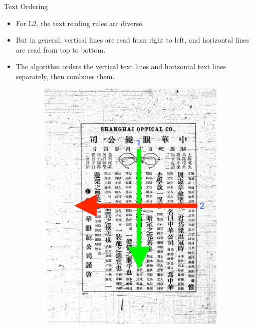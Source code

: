 \documentclass{beamer}
\begin{document}
\begin{frame}
    \begin{center}
        \Large{Text Ordering}
    \end{center}
    \begin{itemize}
        \item For L2, the text reading rules are diverse.
        \item But in general, vertical lines are read from right to left, and horizontal lines are read from top to bottom.
        \item The algorithm orders the vertical text lines and horizontal text lines separately, then combines them.
    \end{itemize}
    \begin{figure}
        \begin{subfigure}[b]{0.3\linewidth}
            \includegraphics[height=1.3\linewidth]{./figures/fnzz1_order.jpeg}
        \end{subfigure}
        \hspace{1cm}

\end{figure}
\end{frame}
\end{document}
